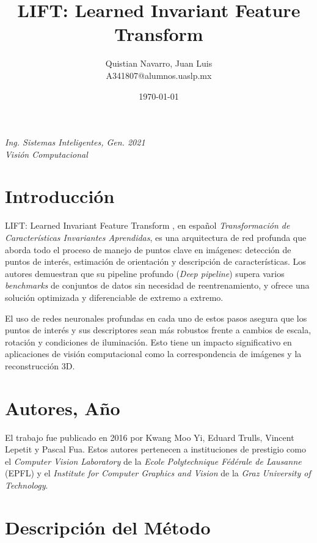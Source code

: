 \documentclass{article}
\title{LIFT: Learned Invariant Feature Transform}
\author{
  \begin{minipage}[t]{0.4\linewidth}
    \centering
    Quistian Navarro, Juan Luis\\
    A341807@alumnos.uaslp.mx 
  \end{minipage}
}
\date{\today}
\begin{document}
\maketitle

\begin{minipage}{\textwidth}
  \centering
  \textit{Ing. Sistemas Inteligentes, Gen. 2021} \\
  \textit{Visión Computacional}
\end{minipage}

\newpage
\section{Introducción}

LIFT: Learned Invariant Feature Transform \cite{yi2016liftlearnedinvariantfeature}, en español \textit{Transformación de Características Invariantes Aprendidas}, es una arquitectura de red profunda que aborda todo el proceso de manejo de puntos clave en imágenes: detección de puntos de interés, estimación de orientación y descripción de características. Los autores demuestran que su pipeline profundo (\textit{Deep pipeline}) supera varios \textit{benchmarks} de conjuntos de datos sin necesidad de reentrenamiento, y ofrece una solución optimizada y diferenciable de extremo a extremo.

El uso de redes neuronales profundas en cada uno de estos pasos asegura que los puntos de interés y sus descriptores sean más robustos frente a cambios de escala, rotación y condiciones de iluminación. Esto tiene un impacto significativo en aplicaciones de visión computacional como la correspondencia de imágenes y la reconstrucción 3D.

\section{Autores, Año}

El trabajo fue publicado en 2016 por Kwang Moo Yi, Eduard Trulls, Vincent Lepetit y Pascal Fua. Estos autores pertenecen a instituciones de prestigio como el \textit{Computer Vision Laboratory} de la \textit{Ecole Polytechnique Fédérale de Lausanne} (EPFL) y el \textit{Institute for Computer Graphics and Vision} de la \textit{Graz University of Technology}.

\section{Descripción del Método}
\end{document}
